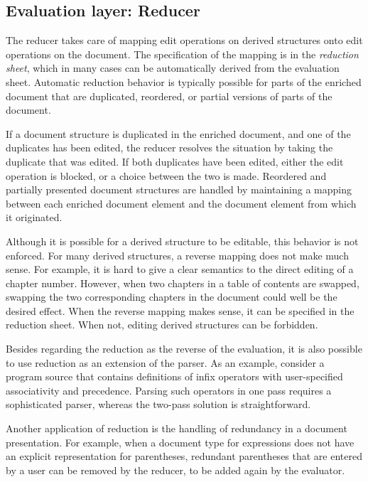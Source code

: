 \documentclass{speauth}
\begin{document}
%																
\subsection{Evaluation layer: Reducer} \label{sect:reducer}

The reducer takes care of mapping edit operations on derived structures onto edit operations on the document. The specification of the mapping is in the {\em reduction sheet}, which in many cases can be automatically derived from the evaluation sheet. Automatic reduction behavior is typically possible for parts of the enriched document that are duplicated, reordered, or partial versions of parts of the document. 

If a document structure is duplicated in the enriched document, and one of the duplicates has been edited, the reducer resolves the situation by taking the duplicate that was edited. If both duplicates have been edited, either the edit operation is blocked, or a choice between the two is made. Reordered and partially presented document structures are handled by maintaining a mapping between each enriched document element and the document element from which it originated.

Although it is possible for a derived structure to be editable, this behavior is not enforced. For many derived structures, a reverse mapping does not make much sense. For example, it is hard to give a clear semantics to the direct editing of a chapter number. However, when two chapters in a table of contents are swapped, swapping the two corresponding chapters in the document could well be the desired effect. When the reverse mapping makes sense, it can be specified in the reduction sheet. When not, editing derived structures can be forbidden.

Besides regarding the reduction as the reverse of the evaluation, it is also possible to use reduction as an extension of the parser. As an example, consider a program source that contains definitions of infix operators with user-specified associativity and precedence. Parsing such operators in one pass requires a sophisticated parser, whereas the two-pass solution is straightforward.

Another application of reduction is the handling of redundancy in a document presentation. For example, when a document type for expressions does not have an explicit representation for parentheses, redundant parentheses that are entered by a user can be removed by the reducer, to be added again by the evaluator.
\end{document}
